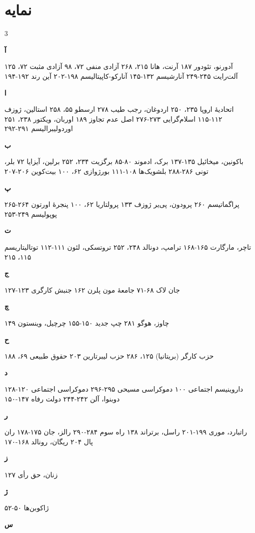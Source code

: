 \chapter*{نمایه}

\begin{multicols}{3}
\footnotesize

\textbf{آ}

آدورنو، تئودور ۱۸۷
آرنت، هانا ۲۱۵، ۲۶۸
آزادی منفی ۷۲، ۹۸
آزادی مثبت ۷۲، ۱۲۵
آلت‌رایت ۲۴۵-۲۴۹
آنارشیسم ۱۳۲-۱۴۵
آنارکو-کاپیتالیسم ۱۹۸-۲۰۲
آین رند ۱۹۲-۱۹۴

\textbf{ا}

اتحادیهٔ اروپا ۲۳۵، ۲۵۰
اردوغان، رجب طیب ۲۷۸
ارسطو ۵۵، ۲۵۸
استالین، ژوزف ۱۱۲-۱۱۵
اسلام‌گرایی ۲۷۳-۲۷۶
اصل عدم تجاوز ۱۸۹
اوربان، ویکتور ۲۳۸، ۲۵۱
اوردولیبرالیسم ۲۹۱-۲۹۲

\textbf{ب}

باکونین، میخائیل ۱۳۵-۱۳۷
برک، ادموند ۸۰-۸۵
برگزیت ۲۳۴، ۲۵۲
برلین، آیزایا ۷۲
بلر، تونی ۲۸۶-۲۸۸
بلشویک‌ها ۱۰۸-۱۱۱
بورژوازی ۶۲، ۱۰۰
بیت‌کوین ۲۰۶-۲۰۷

\textbf{پ}

پراگماتیسم ۲۶۰
پرودون، پی‌یر ژوزف ۱۳۳
پرولتاریا ۶۲، ۱۰۰
پنجرهٔ اورتون ۲۶۴-۲۶۵
پوپولیسم ۲۴۹-۲۵۳

\textbf{ت}

تاچر، مارگارت ۱۶۵-۱۶۸
ترامپ، دونالد ۲۴۸، ۲۵۲
تروتسکی، لئون ۱۱۱-۱۱۲
توتالیتاریسم ۱۱۵، ۲۱۵

\textbf{ج}

جان لاک ۶۸-۷۱
جامعهٔ مون پلرن ۱۶۲
جنبش کارگری ۱۲۳-۱۲۷

\textbf{چ}

چاوز، هوگو ۲۸۱
چپ جدید ۱۵۰-۱۵۵
چرچیل، وینستون ۱۴۹

\textbf{ح}

حزب کارگر (بریتانیا) ۱۲۵، ۲۸۶
حزب لیبرتارین ۲۰۳
حقوق طبیعی ۶۹، ۱۸۸

\textbf{د}

داروینیسم اجتماعی ۱۰۰
دموکراسی مسیحی ۲۹۵-۲۹۶
دموکراسی اجتماعی ۱۲۰-۱۲۸
دوبنوا، آلن ۲۴۲-۲۴۴
دولت رفاه ۱۴۷-۱۵۰

\textbf{ر}

راتبارد، موری ۱۹۹-۲۰۱
راسل، برتراند ۱۳۸
راه سوم ۲۸۴-۲۹۰
رالز، جان ۱۷۵-۱۷۸
ران پال ۲۰۴
ریگان، رونالد ۱۶۸-۱۷۰

\textbf{ز}

زنان، حق رأی ۱۲۷

\textbf{ژ}

ژاکوبن‌ها ۵۰-۵۲

\textbf{س}


\end{multicols}
